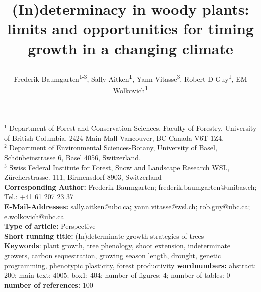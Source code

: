 \documentclass{article}
\begin{document}
	
	
	\title{(In)determinacy in woody plants: limits and opportunities for timing growth in a changing climate %
		
		
		
		
	
	} 
	
	\author{Frederik Baumgarten\textsuperscript{1-3}, Sally Aitken\textsuperscript{1}, Yann Vitasse\textsuperscript{3}, Robert D Guy\textsuperscript{1}, EM Wolkovich\textsuperscript{1}}
	\maketitle
	
	$^1$ Department of Forest and Conservation Sciences, Faculty of Forestry, University of British Columbia, 2424 Main Mall
	Vancouver, BC Canada V6T 1Z4. \\
	$^2$  
	Department of Environmental Sciences-Botany, University of Basel, Schönbeinstrasse 6, Basel 4056, Switzerland. \\
	$^3$  
	Swiss Federal Institute for Forest, Snow and Landscape Research WSL, Zürcherstrasse. 111, Birmensdorf 8903, Switzerland
	\\
	\textbf{Corresponding Author:} Frederik Baumgarten; frederik.baumgarten@unibas.ch; \\
	Tel.: +41 61 207 23 37\\
	\textbf{E-Mail-Addresses:} sally.aitken@ubc.ca; yann.vitasse@wsl.ch; rob.guy@ubc.ca;	e.wolkovich@ubc.ca\\
\textbf{Type of article:} Perspective\\
\textbf{Short running title:} (In)determinate growth strategies of trees\\
\textbf{Keywords}: plant growth, tree phenology, shoot extension, indeterminate growers, carbon sequestration, growing season length, drought, genetic programming, phenotypic plasticity, forest productivity
\textbf{wordnumbers:} abstract: 200; main text: 4005; box1: 404; number of figures: 4; number of tables: 0\\
\textbf{number of references:} 100
\end{document}
